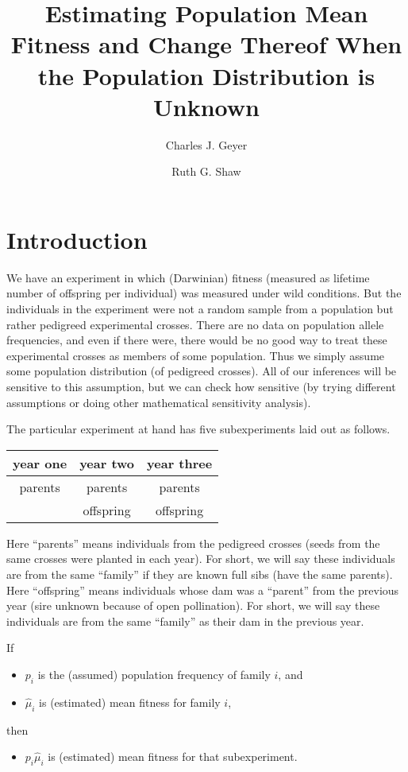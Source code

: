\documentclass[11pt]{article}
\begin{document}
\title{Estimating Population Mean Fitness and Change Thereof When
    the Population Distribution is Unknown}

\author{Charles J. Geyer \and Ruth G. Shaw}

\maketitle

\section{Introduction}

We have an experiment in which (Darwinian) fitness (measured as lifetime
number of offspring per individual) was measured under wild conditions.
But the individuals in the experiment were not a random sample from
a population but rather pedigreed experimental crosses.  There are no data on
population allele frequencies, and even if there were, there would be
no good way to treat these experimental crosses as members of some
population.  Thus we simply assume some population distribution (of
pedigreed crosses).  All of our inferences will be sensitive to this
assumption, but we can check how sensitive (by trying different assumptions
or doing other mathematical sensitivity analysis).

The particular experiment at hand has five subexperiments laid out as follows.
\begin{center}
\begin{tabular}{ccc}
year one & year two & year three \\
\hline
parents & parents & parents \\
        & offspring & offspring
\end{tabular}
\end{center}
Here ``parents'' means individuals from the pedigreed crosses (seeds from
the same crosses were planted in each year).  For short, we will say these
individuals are from the same ``family'' if they are known full sibs
(have the same parents).
Here ``offspring'' means individuals whose dam was a ``parent'' from the
previous year (sire unknown because of open pollination).
For short, we will say these
individuals are from the same ``family'' as their dam in the previous year.

If
\begin{itemize}
\item $p_i$ is the (assumed) population frequency of family $i$, and
\item $\hat{\mu}_i$ is (estimated) mean fitness for family $i$,
\end{itemize}
then
\begin{itemize}
\item $p_i \hat{\mu}_i$ is (estimated) mean fitness for that subexperiment.
\end{itemize}
\end{document}
